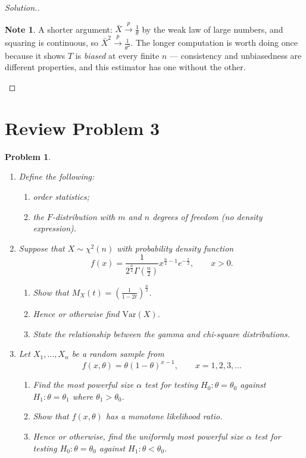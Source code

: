 \documentclass[12pt,a4paper]{report}
\theoremstyle{definition}
\newtheorem{note}[thm]{Note}
\theoremstyle{plain}
\newtheorem{problemx}{Problem}[section]
\newenvironment{problem}{\begin{problemx}}{\end{problemx}}
\newenvironment{solution}
  {\renewcommand{\qedsymbol}{}\begin{proof}[\textit{Solution}.]}
  {\end{proof}}
\begin{document}
\begin{solution}
\begin{note}
A shorter argument: $\bar X\stackrel{p}{\to}\frac{1}{\theta}$ by the weak law of
large numbers, and squaring is continuous, so $\bar X^2\stackrel{p}{\to}
\frac{1}{\theta^2}$. The longer computation is worth doing once because it shows
$T$ is \emph{biased} at every finite $n$ --- consistency and unbiasedness are
different properties, and this estimator has one without the other.
\end{note}
\end{solution}

\section{Review Problem 3}

\begin{problem}
\begin{enumerate}
\item[(a).] Define the following:
  \begin{enumerate}
  \item[(i).] order statistics;
  \item[(ii).] the $F$-distribution with $m$ and $n$ degrees of freedom (no
  density expression).
  \end{enumerate}
\item[(b).] Suppose that $X\sim\chi^2(n)$ with probability density function
\[f(x)=\frac{1}{2^{\frac{n}{2}}\Gamma\left(\frac{n}{2}\right)}
x^{\frac{n}{2}-1}e^{-\frac{x}{2}},\qquad x>0.\]
  \begin{enumerate}
  \item[(i).] Show that $M_X(t)=\left(\frac{1}{1-2t}\right)^{\frac{n}{2}}$.
  \item[(ii).] Hence or otherwise find $\text{Var}(X)$.
  \item[(iii).] State the relationship between the gamma and chi-square
  distributions.
  \end{enumerate}
\item[(c).] Let $X_1,\ldots,X_n$ be a random sample from
\[f(x,\theta)=\theta(1-\theta)^{x-1},\qquad x=1,2,3,\ldots\]
  \begin{enumerate}
  \item[(i).] Find the most powerful size $\alpha$ test for testing
  $H_0:\theta=\theta_0$ against $H_1:\theta=\theta_1$ where $\theta_1>\theta_0$.
  \item[(ii).] Show that $f(x,\theta)$ has a monotone likelihood ratio.
  \item[(iii).] Hence or otherwise, find the uniformly most powerful size
  $\alpha$ test for testing $H_0:\theta=\theta_0$ against
  $H_1:\theta<\theta_0$.
  \end{enumerate}
\end{enumerate}
\end{problem}
\end{document}
